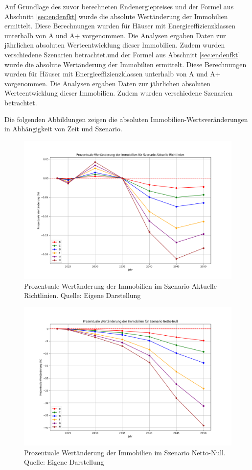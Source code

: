 Auf Grundlage des zuvor berechneten Endenergiepreises und der Formel aus Abschnitt \ref{sec:endenfkt} wurde die absolute Wertänderung der Immobilien ermittelt. Diese Berechnungen wurden für Häuser mit Energieeffizienzklassen unterhalb von A und A+ vorgenommen. Die Analysen ergaben Daten zur jährlichen absoluten Werteentwicklung dieser Immobilien. Zudem wurden verschiedene Szenarien betrachtet.und der Formel aus Abschnitt \ref{sec:endenfkt} wurde die absolute Wertänderung der Immobilien ermittelt. Diese Berechnungen wurden für Häuser mit Energieeffizienzklassen unterhalb von A und A+ vorgenommen. Die Analysen ergaben Daten zur jährlichen absoluten Werteentwicklung dieser Immobilien. Zudem wurden verschiedene Szenarien betrachtet.

Die folgenden Abbildungen zeigen die absoluten Immobilien-Wertsveränderungen in Abhängigkeit von Zeit und Szenario.
\begin{figure}[H]
    \centering
    \includegraphics[width=\linewidth]{figures/Aktuelle Richtlinien_percentage_change_plot.png}
    \caption{Prozentuale Wertänderung der Immobilien im Szenario Aktuelle Richtlinien. Quelle: Eigene Darstellung}
    \label{fig:aktuelle_richtlinien}
\end{figure}

\begin{figure}[H]
    \centering
    \includegraphics[width=\linewidth]{figures/Netto-Null_percentage_change_plot.png}
    \caption{Prozentuale Wertänderung der Immobilien im Szenario Netto-Null. Quelle: Eigene Darstellung}
    \label{fig:netto_null}
\end{figure}

